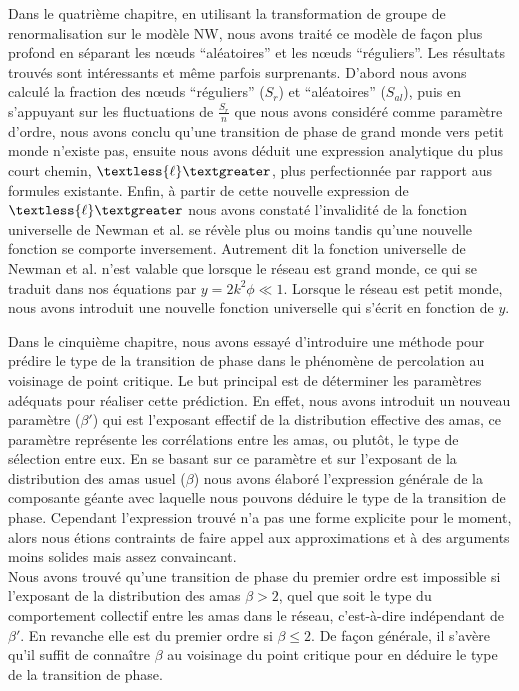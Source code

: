 Dans le quatrième chapitre, en utilisant la transformation de groupe de renormalisation sur le modèle NW, nous avons traité ce modèle de façon plus profond en séparant les nœuds ``aléatoires'' et les nœuds ``réguliers''. Les résultats trouvés sont intéressants et même parfois surprenants. D'abord nous avons calculé la fraction des nœuds ``réguliers''  ($S_r$) et ``aléatoires'' ($S_{al}$), puis en s'appuyant sur les fluctuations de $\frac {S_r}{n}$ que nous avons considéré comme paramètre d'ordre, nous avons conclu qu'une transition de phase de grand monde vers petit monde n'existe pas, ensuite nous avons déduit une expression analytique du plus court chemin, $\textless {\ell} \textgreater$, plus perfectionnée par rapport aus formules existante. Enfin, à partir de cette nouvelle expression de $\textless {\ell} \textgreater$ nous avons constaté l'invalidité de la fonction universelle de Newman et al. \cite{Newman-Watts1999-2} se révèle  plus ou moins tandis qu'une nouvelle fonction se comporte inversement. Autrement dit la fonction universelle de Newman et al. \cite{Newman-Watts1999-2} n'est valable que lorsque le réseau est grand monde, ce qui se traduit dans nos équations par $y=2k^2\phi \ll 1$. Lorsque le réseau est petit monde, nous avons introduit une nouvelle fonction universelle qui s'écrit en fonction de $y$.

Dans le cinquième chapitre, nous avons essayé d'introduire une méthode pour prédire le type de la transition de phase dans le phénomène de percolation au voisinage de point critique. Le but principal est de déterminer les paramètres adéquats pour réaliser cette prédiction. En effet, nous avons introduit un nouveau paramètre ($\beta'$) qui est l'exposant  effectif de la distribution effective des amas, ce paramètre représente les corrélations entre les amas, ou plutôt, le type de sélection entre eux. En se basant sur ce paramètre et  sur l'exposant de la distribution des amas usuel ($\beta$) nous avons élaboré l'expression générale de la composante géante avec laquelle nous pouvons déduire le type de la transition de phase. Cependant l'expression trouvé n'a pas une forme explicite pour le moment, alors nous étions contraints de faire appel aux approximations et à des arguments moins solides mais assez convaincant. \\
Nous avons trouvé qu'une transition de phase du premier ordre est impossible si l'exposant de la distribution des amas $\beta>2$, quel que soit le type du comportement collectif entre les amas  dans le réseau, c'est-à-dire indépendant de $\beta'$. En revanche elle est du premier ordre si $\beta\leq2$. De façon générale, il s'avère qu'il suffit de connaître $\beta$ au voisinage du point critique pour en déduire le type de la transition de phase.\\ 